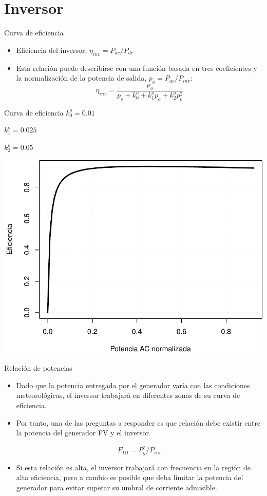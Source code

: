 \documentclass[xcolor={usenames,svgnames,dvipsnames}]{beamer}
\begin{document}
\section{Inversor}
\label{sec-2}

\begin{frame}[label=sec-2-0-1]{Curva de eficiencia}
\begin{itemize}
\item Eficiencia del inversor, $\eta_{inv} = P_{ac} / P_{dc}$

\item Esta relación puede describirse con una función basada en tres coeficientes y la normalización de la potencia de salida, $p_{o}=P_{ac}/P_{inv}$: $$\eta_{inv}=\frac{p_{o}}{p_{o}+k_{0}^{o}+k_{1}^{o}p_{o}+k_{2}^{o}p_{o}^{2}}$$
\end{itemize}
\end{frame}


\begin{frame}[label=sec-2-0-2]{Curva de eficiencia}
$k_{0}^{o}=0.01$

$k_{1}^{o}=0.025$

$k_{2}^{o}=0.05$

\includegraphics[width=.9\linewidth]{../figs/CurvaInversor.pdf}
\end{frame}

\begin{frame}[label=sec-2-0-3]{Relación de potencias}
\begin{itemize}
\item Dado que la potencia entregada por el generador varía con las condiciones meteorológicas, el inversor trabajará en diferentes zonas de su curva de eficiencia.

\item Por tanto, una de las preguntas a responder es \alert{que relación debe existir entre la potencia del generador FV y el inversor}.

\[F_{DI} = P_{g}^{*}/P_{inv}\]

\item Si esta relación es alta, el inversor trabajará con frecuencia en la región de alta eficiencia, pero a cambio es posible que deba limitar la potencia del generador para evitar superar su umbral de corriente admisible.
\end{itemize}
\end{frame}
\end{document}
